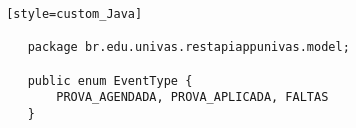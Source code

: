 
\begin{lstlisting} [style=custom_Java] 	

	package br.edu.univas.restapiappunivas.model;
	
	public enum EventType {
		PROVA_AGENDADA, PROVA_APLICADA, FALTAS
	}

\end{lstlisting}



